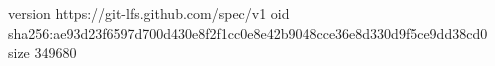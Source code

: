 version https://git-lfs.github.com/spec/v1
oid sha256:ae93d23f6597d700d430e8f2f1cc0e8e42b9048cce36e8d330d9f5ce9dd38cd0
size 349680
